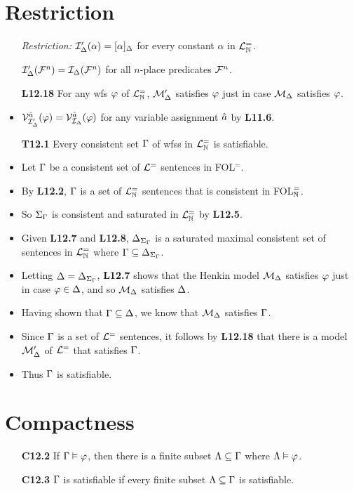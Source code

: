 \documentclass[a4paper, 11pt]{article} %
\begin{document}
\section*{Restriction}

\begin{itemize}
  \item[\it Restriction:] $\mathcal{I}'_{\Delta}(\alpha)=[\alpha]_{\Delta}$ for every constant $\alpha$ in $\mathcal{L}^{=}_{\mathbb{N}}$.
    \item[] $\mathcal{I}'_{\Delta}(\mathcal{F}^n)=\mathcal{I}_{\Delta}(\mathcal{F}^n)$ for all $n$-place predicates $\mathcal{F}^n$. 
  \item[\bf L12.18] For any wfs $\varphi$ of $\mathcal{L}^{=}_{\mathbb{N}}$, $\mathcal{M}'_{\Delta}$ satisfies $\varphi$ just in case $\mathcal{M}_{\Delta}$ satisfies $\varphi$.
    \item $\mathcal{V}_{\mathcal{I}'_{\Delta}}^{\hat{a}}(\varphi) = \mathcal{V}_{\mathcal{I}_{\Delta}}^{\hat{a}}(\varphi)$ for any variable assignment $\hat{a}$ by \textbf{L11.6}.
  \item[\bf T12.1] Every consistent set $\Gamma$ of wfss in $\mathcal{L}^{=}_{\mathbb{N}}$ is satisfiable.
    \item Let $\Gamma$ be a consistent set of $\mathcal{L}^=$ sentences in FOL$^=$.
    \item By \textbf{L12.2}, $\Gamma$ is a set of $\mathcal{L}^{=}_{\mathbb{N}}$ sentences that is consistent in FOL$^=_{\mathbb{N}}$.
    \item So $\Sigma_{\Gamma}$ is consistent and saturated in $\mathcal{L}^{=}_{\mathbb{N}}$ by \textbf{L12.5}. 
    \item Given \textbf{L12.7} and \textbf{L12.8}, $\Delta_{\Sigma_{\Gamma}}$ is a saturated maximal consistent set of sentences in $\mathcal{L}^{=}_{\mathbb{N}}$ where $\Gamma\subseteq\Delta_{\Sigma_{\Gamma}}$.
    \item Letting $\Delta=\Delta_{\Sigma_{\Gamma}}$, \textbf{L12.7} shows that the Henkin model $\mathcal{M}_{\Delta}$ satisfies $\varphi$ just in case $\varphi\in\Delta$, and so $\mathcal{M}_{\Delta}$ satisfies $\Delta$.
    \item Having shown that $\Gamma\subseteq\Delta$, we know that $\mathcal{M}_{\Delta}$ satisfies $\Gamma$.
    \item Since $\Gamma$ is a set of $\mathcal{L}^=$ sentences, it follows by \textbf{L12.18} that there is a model $\mathcal{M}'_{\Delta}$ of $\mathcal{L}^=$ that satisfies $\Gamma$.
    \item Thus $\Gamma$ is satisfiable.
\end{itemize}


\section*{Compactness}

\begin{itemize}
  \item[\bf C12.2] If $\Gamma\vDash\varphi$, then there is a finite subset $\Lambda\subseteq\Gamma$ where $\Lambda\vDash\varphi$.
  \item[\bf C12.3] $\Gamma$ is satisfiable if every finite subset $\Lambda\subseteq\Gamma$ is satisfiable.
\end{itemize}
\end{document}
